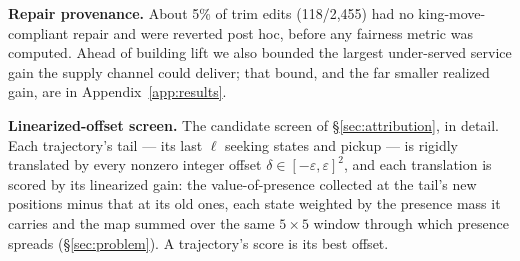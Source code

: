\textbf{Repair provenance.} About 5\% of trim edits (118/2{,}455) had no
king-move-com\-pli\-ant repair and were reverted post hoc, before any fairness
metric was computed. Ahead of building lift we also bounded the largest
under-served service gain the supply channel could deliver; that bound, and the
far smaller realized gain, are in Appendix~\ref{app:results}.

\textbf{Linearized-offset screen.} The candidate screen of
\S\ref{sec:attribution}, in detail. Each trajectory's tail --- its last
$\ell$ seeking states and pickup --- is rigidly translated by every nonzero
integer offset $\delta \in [-\varepsilon, \varepsilon]^{2}$, and each
translation is scored by its linearized gain: the value-of-presence
collected at the tail's new positions minus that at its old ones, each state
weighted by the presence mass it carries and the map summed over the same
$5{\times}5$ window through which presence spreads (\S\ref{sec:problem}). A
trajectory's score is its best offset.

